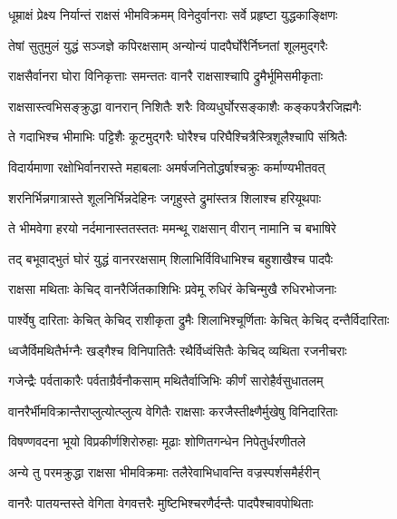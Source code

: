
\twolineshloka
{धूम्राक्षं प्रेक्ष्य निर्यान्तं राक्षसं भीमविक्रमम्}
{विनेदुर्वानराः सर्वे प्रहृष्टा युद्धकाङ्क्षिणः} %

\twolineshloka
{तेषां सुतुमुलं युद्धं सञ्जज्ञे कपिरक्षसाम्}
{अन्योन्यं पादपैर्घोरैर्निघ्नतां शूलमुद्गरैः} %

\twolineshloka
{राक्षसैर्वानरा घोरा विनिकृत्ताः समन्ततः}
{वानरै राक्षसाश्चापि द्रुमैर्भूमिसमीकृताः} %

\twolineshloka
{राक्षसास्त्वभिसङ्क्रुद्धा वानरान् निशितैः शरैः}
{विव्यधुर्घोरसङ्काशैः कङ्कपत्रैरजिह्मगैः} %

\twolineshloka
{ते गदाभिश्च भीमाभिः पट्टिशैः कूटमुद्गरैः}
{घोरैश्च परिघैश्चित्रैस्त्रिशूलैश्चापि संश्रितैः} %

\twolineshloka
{विदार्यमाणा रक्षोभिर्वानरास्ते महाबलाः}
{अमर्षजनितोद्धर्षाश्चक्रुः कर्माण्यभीतवत्} %

\twolineshloka
{शरनिर्भिन्नगात्रास्ते शूलनिर्भिन्नदेहिनः}
{जगृहुस्ते द्रुमांस्तत्र शिलाश्च हरियूथपाः} %

\twolineshloka
{ते भीमवेगा हरयो नर्दमानास्ततस्ततः}
{ममन्थू राक्षसान् वीरान् नामानि च बभाषिरे} %

\twolineshloka
{तद् बभूवाद्भुतं घोरं युद्धं वानररक्षसाम्}
{शिलाभिर्विविधाभिश्च बहुशाखैश्च पादपैः} %

\twolineshloka
{राक्षसा मथिताः केचिद् वानरैर्जितकाशिभिः}
{प्रवेमू रुधिरं केचिन्मुखै रुधिरभोजनाः} %

\twolineshloka
{पार्श्वेषु दारिताः केचित् केचिद् राशीकृता द्रुमैः}
{शिलाभिश्चूर्णिताः केचित् केचिद् दन्तैर्विदारिताः} %

\twolineshloka
{ध्वजैर्विमथितैर्भग्नैः खड्गैश्च विनिपातितैः}
{रथैर्विध्वंसितैः केचिद् व्यथिता रजनीचराः} %

\twolineshloka
{गजेन्द्रैः पर्वताकारैः पर्वताग्रैर्वनौकसाम्}
{मथितैर्वाजिभिः कीर्णं सारोहैर्वसुधातलम्} %

\twolineshloka
{वानरैर्भीमविक्रान्तैराप्लुत्योत्प्लुत्य वेगितैः}
{राक्षसाः करजैस्तीक्ष्णैर्मुखेषु विनिदारिताः} %

\twolineshloka
{विषण्णवदना भूयो विप्रकीर्णशिरोरुहाः}
{मूढाः शोणितगन्धेन निपेतुर्धरणीतले} %

\twolineshloka
{अन्ये तु परमक्रुद्धा राक्षसा भीमविक्रमाः}
{तलैरेवाभिधावन्ति वज्रस्पर्शसमैर्हरीन्} %

\twolineshloka
{वानरैः पातयन्तस्ते वेगिता वेगवत्तरैः}
{मुष्टिभिश्चरणैर्दन्तैः पादपैश्चावपोथिताः} %

